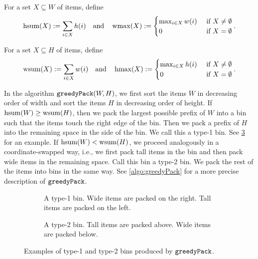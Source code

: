 For a set $X \subseteq W$ of items, define
\[ \operatorname{hsum}(X) := \sum_{i \in X} h(i) \quad\textrm{and}\quad
\operatorname{wmax}(X) := \begin{cases}\max_{i \in X} w(i) & \textrm{ if } X \neq \emptyset
\\ 0 & \textrm{ if } X = \emptyset\end{cases}. \]

For a set $X \subseteq H$ of items, define
\[ \operatorname{wsum}(X) := \sum_{i \in X} w(i) \quad\textrm{and}\quad
\operatorname{hmax}(X) := \begin{cases}\max_{i \in X} h(i) & \textrm{ if } X \neq \emptyset
\\ 0 & \textrm{ if } X = \emptyset\end{cases}. \]

In the algorithm $\operatorname{\mathtt{greedyPack}}(W, H)$, we first sort the items $W$ in decreasing order
of width and sort the items $H$ in decreasing order of height.
If $\operatorname{hsum}(W) \ge \operatorname{wsum}(H)$, then we pack the largest possible prefix of $W$
into a bin such that the items touch the right edge of the bin.
Then we pack a prefix of $H$ into the remaining space in the side of the bin.
We call this a type-1 bin. See \cref{fig:greedy-pack} for an example.
If $\operatorname{hsum}(W) < \operatorname{wsum}(H)$, we proceed analogously in a coordinate-swapped way,
i.e., we first pack tall items in the bin and then pack wide items in the remaining space.
Call this bin a type-2 bin.
We pack the rest of the items into bins in the same way.
See \cref{algo:greedyPack} for a more precise description of $\operatorname{\mathtt{greedyPack}}$.

\begin{figure}[!ht]
\begin{subfigure}{0.45\textwidth}
    \centering
    
    \caption{A type-1 bin. Wide items are packed on the right. Tall items are packed on the left.}%
\label{fig:greedy-pack:1}
\end{subfigure}
\hfil
\begin{subfigure}{0.45\textwidth}
    \centering
    
    \caption{A type-2 bin. Tall items are packed above. Wide items are packed below.}%
\label{fig:greedy-pack:2}
\end{subfigure}
\caption{Examples of type-1 and type-2 bins produced by $\operatorname{\mathtt{greedyPack}}$.}
\label{fig:greedy-pack}
\end{figure}

